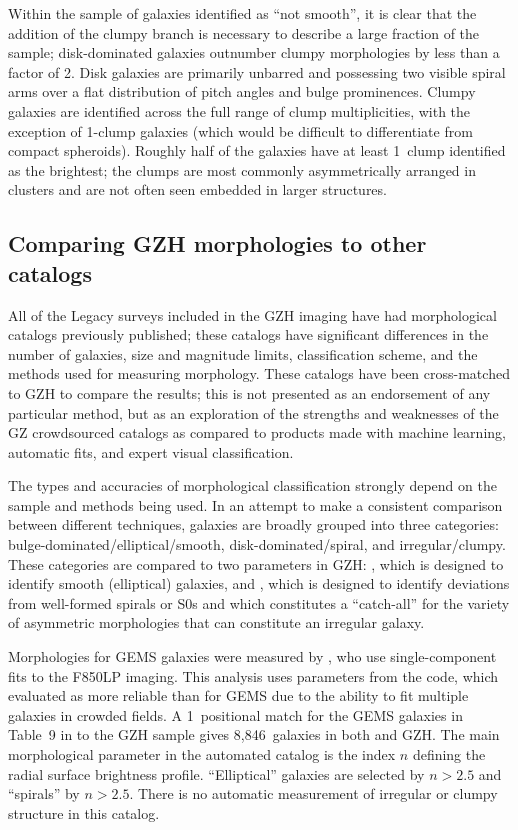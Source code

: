 \documentclass[twocolumn]{aastex6}
\begin{document}
Within the sample of galaxies identified as ``not smooth'', it is clear that the addition of the clumpy branch is necessary to describe a large fraction of the sample; disk-dominated galaxies outnumber clumpy morphologies by less than a factor of 2. Disk galaxies are primarily unbarred \citet{mel14} and possessing two visible spiral arms over a flat distribution of pitch angles and bulge prominences. Clumpy galaxies are identified across the full range of clump multiplicities, with the exception of 1-clump galaxies (which would be difficult to differentiate from compact spheroids). Roughly half of the galaxies have at least 1~clump identified as the brightest; the clumps are most commonly asymmetrically arranged in clusters and are not often seen embedded in larger structures. 

\subsection{Comparing GZH morphologies to other catalogs}\label{ssec:comparisons}

All of the Legacy surveys included in the GZH imaging have had morphological catalogs previously published; these catalogs have significant differences in the number of galaxies, size and magnitude limits, classification scheme, and the methods used for measuring morphology. These catalogs have been cross-matched to GZH to compare the results; this is not presented as an endorsement of any particular method, but as an exploration of the strengths and weaknesses of the GZ crowdsourced catalogs as compared to products made with machine learning, automatic fits, and expert visual classification. 

The types and accuracies of morphological classification strongly depend on the sample and methods being used. In an attempt to make a consistent comparison between different techniques, galaxies are broadly grouped into three categories: bulge-dominated/elliptical/smooth, disk-dominated/spiral, and irregular/clumpy. These categories are compared to two parameters in GZH: \fbest, which is designed to identify smooth (elliptical) galaxies, and \fodd, which is designed to identify deviations from well-formed spirals or S0s and which constitutes a ``catch-all'' for the variety of asymmetric morphologies that can constitute an irregular galaxy. 

Morphologies for GEMS galaxies were measured by \citet{hau07}, who use single-component \sersic{} fits to the F850LP imaging. This analysis uses parameters from the \galfit{} code, which \citet{hau07} evaluated as more reliable than \gimtwod{} for GEMS due to the ability to fit multiple galaxies in crowded fields. A 1\arcsec~positional match for the GEMS galaxies in Table~9 in \citet{hau07} to the GZH sample gives 8,846~galaxies in both \citet{hau07} and GZH. The main morphological parameter in the automated catalog is the \sersic{} index $n$ defining the radial surface brightness profile. ``Elliptical'' galaxies are selected by $n>2.5$ and ``spirals''  by $n>2.5$. There is no automatic measurement of irregular or clumpy structure in this catalog. 
\end{document}
